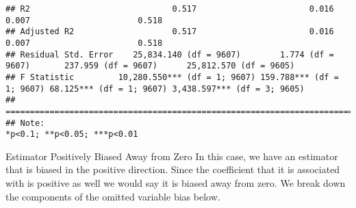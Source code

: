 \documentclass[
]{article}
\begin{document}
\begin{verbatim}
## R2                             0.517                       0.016                    0.007                      0.518           
## Adjusted R2                    0.517                       0.016                    0.007                      0.518           
## Residual Std. Error    25,834.140 (df = 9607)        1.774 (df = 9607)       237.959 (df = 9607)      25,812.570 (df = 9605)   
## F Statistic         10,280.550*** (df = 1; 9607) 159.788*** (df = 1; 9607) 68.125*** (df = 1; 9607) 3,438.597*** (df = 3; 9605)
## ===============================================================================================================================
## Note:                                                                                               *p<0.1; **p<0.05; ***p<0.01
\end{verbatim}

Estimator Positively Biased Away from Zero In this case, we have an
estimator that is biased in the positive direction. Since the
coefficient that it is associated with is positive as well we would say
it is biased away from zero. We break down the components of the omitted
variable bias below.
\end{document}
